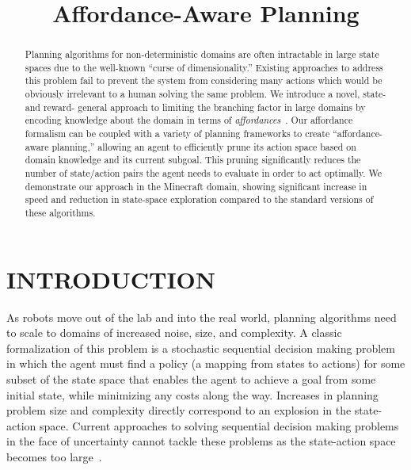 \documentclass[]{article}
\title{Affordance-Aware Planning}
\newcommand{\stnote}[1]{\textcolor{Blue}{\textbf{ST: #1}}}
\begin{document}
\author{}
\maketitle

\begin{abstract}

Planning algorithms for non-deterministic domains are often
intractable in large state spaces due to the well-known ``curse of
dimensionality.''  Existing approaches to address this problem fail to
prevent the system from considering many actions which would be
obviously irrelevant to a human solving the same problem.  We
introduce a novel, state- and reward- general approach to limiting the
branching factor in large domains by encoding knowledge about the
domain in terms of {\em affordances}~\citep{gibson77}.  Our affordance
formalism can be coupled with a variety of planning frameworks to
create ``affordance-aware planning,'' allowing an agent to efficiently
prune its action space based on domain knowledge and its current
subgoal.  This pruning significantly reduces the number of
state/action pairs the agent needs to evaluate in order to act
optimally. We demonstrate our approach in the Minecraft domain,
showing significant increase in speed and reduction in state-space
exploration compared to the standard versions of these algorithms.

\end{abstract}


\section{INTRODUCTION}

As robots move out of the lab and into the real world, planning
algorithms need to scale to domains of increased noise, size, and
complexity.  A classic formalization of this problem is a stochastic
sequential decision making problem in which the agent must find a
policy (a mapping from states to actions) for some subset of the state
space that enables the agent to achieve a goal from some initial
state, while minimizing any costs along the way.
Increases in planning problem size
and complexity directly correspond to an explosion in the state-action
space. Current approaches to solving sequential decision making
problems in the face of uncertainty cannot tackle these problems 
as the state-action space becomes too large~\citep{grounds05}.
\end{document}
